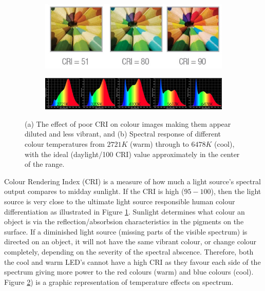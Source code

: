 \documentclass[fleqn,twoside,12pt]{report}
\begin{document}
\begin{figure}[h]
	\centering
	\begin{subfigure}{\textwidth}
		\centering
		\includegraphics[width=0.8\linewidth]{cri.jpg}
		\caption{}
		\label{fig:cri}
	\end{subfigure}%

	\begin{subfigure}{\textwidth}
		\centering
		\includegraphics[width=\linewidth]{temp_response.jpg}
		\caption{}
		\label{fig:temp_response}
	\end{subfigure}%
	\caption{(a) The effect of poor CRI on colour images making them appear diluted and less vibrant, and (b) Spectral response of different colour temperatures from $2721K$ (warm) through to $6478K$ (cool), with the ideal (daylight/100 CRI) value approximately in the center of the range.}
	\label{}
\end{figure}


Colour Rendering Index (CRI) is a measure of how much a light source's spectral output compares to midday sunlight. If the CRI is high ($95-100$), then the light source is very close to the ultimate light source responsible human colour differentiation as illustrated in Figure \ref{fig:cri}. Sunlight determines what colour an object is via the reflection/absorbsion characteristics in the pigments on the surface. If a diminished light source (missing parts of the visible spectrum) is directed on an object, it will not have the same vibrant colour, or change colour completely, depending on the severity of the spectral abscence. Therefore, both the cool and warm LED's cannot have a high CRI as they favour each side of the spectrum giving more power to the red colours (warm) and blue colours (cool). Figure \ref{fig:temp_response}) is a graphic representation of temperature effects on spectrum.
\end{document}
